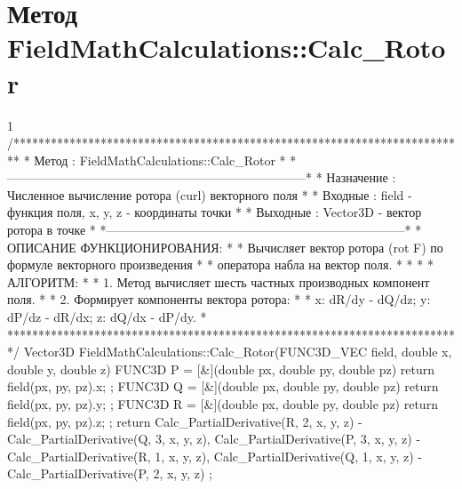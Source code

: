 \section{Метод FieldMathCalculations::Calc\_Rotor}
\footnotesize
\begin{listing}{1}
/*************************************************************************
* Метод         : FieldMathCalculations::Calc_Rotor                      *
*------------------------------------------------------------------------*
* Назначение    : Численное вычисление ротора (curl) векторного поля     *
* Входные       : field - функция поля, x, y, z - координаты точки       *
* Выходные      : Vector3D - вектор ротора в точке                       *
*------------------------------------------------------------------------*
* ОПИСАНИЕ ФУНКЦИОНИРОВАНИЯ:                                             *
* Вычисляет вектор ротора (rot F) по формуле векторного произведения     *
* оператора набла на вектор поля.                                        *
* *
* АЛГОРИТМ:                                                              *
* 1. Метод вычисляет шесть частных производных компонент поля.           *
* 2. Формирует компоненты вектора ротора:                                *
* x: dR/dy - dQ/dz; y: dP/dz - dR/dx; z: dQ/dx - dP/dy.               *
*************************************************************************/
Vector3D FieldMathCalculations::Calc_Rotor(FUNC3D_VEC field, double x, 
                                           double y, double z) {
    FUNC3D P = [&](double px, double py, double pz) { 
        return field(px, py, pz).x; };
    FUNC3D Q = [&](double px, double py, double pz) { 
        return field(px, py, pz).y; };
    FUNC3D R = [&](double px, double py, double pz) { 
        return field(px, py, pz).z; };
    return {
        Calc_PartialDerivative(R, 2, x, y, z) - Calc_PartialDerivative(Q, 3, x, y, z),
        Calc_PartialDerivative(P, 3, x, y, z) - Calc_PartialDerivative(R, 1, x, y, z),
        Calc_PartialDerivative(Q, 1, x, y, z) - Calc_PartialDerivative(P, 2, x, y, z)
    };
}
\end{listing}
\normalsize

\pagebreak

